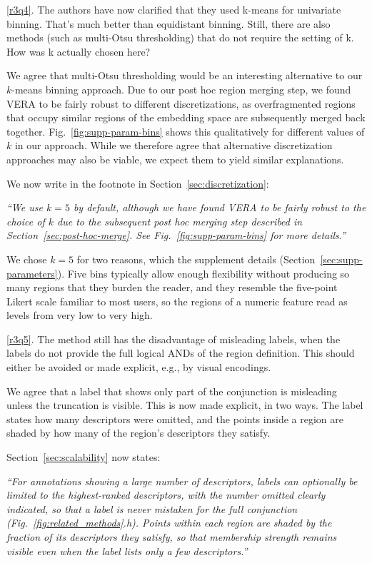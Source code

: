 \documentclass[11pt]{article}
\newcounter{rtaskno}
\newcommand{\rtask}[1]{\refstepcounter{rtaskno}\label{#1}}
\newcommand{\reviewc}[2]{\begin{leftbar}\noindent\rtask{#1}\ref{#1}. #2\end{leftbar}\vspace*{-4mm}}
\newcommand{\answer}[1]{\noindent #1\par\vspace{2mm}}
\newcommand{\copyquote}[1]{\vspace{1mm} {\itshape ``#1''}\vspace{1mm}}
\newlength{\leftbarwidth}
\newlength{\leftbarsep}
\renewenvironment{leftbar}{%
    \def\FrameCommand{{\color{black}{\vrule width \leftbarwidth\relax\hspace {\leftbarsep}}}}%
    \MakeFramed {\advance \hsize -\width \FrameRestore }%
}{\endMakeFramed}
\begin{document}
\reviewc{r3q4}{The authors have now clarified that they used k-means for univariate binning. That's much better than equidistant binning. Still, there are also methods (such as multi-Otsu thresholding) that do not require the setting of k. How was k actually chosen here?}

\answer{%
We agree that multi-Otsu thresholding would be an interesting alternative to our $k$-means binning approach. Due to our post hoc region merging step, we found VERA to be fairly robust to different discretizations, as overfragmented regions that occupy similar regions of the embedding space are subsequently merged back together. Fig.~\ref{fig:supp-param-bins} shows this qualitatively for different values of $k$ in our approach. While we therefore agree that alternative discretization approaches may also be viable, we expect them to yield similar explanations.

We now write in the footnote in Section~\ref{sec:discretization}:

\copyquote{We use $k=5$ by default, although we have found VERA to be fairly robust to the choice of $k$ due to the subsequent post hoc merging step described in Section~\ref{sec:post-hoc-merge}. See Fig.~\ref{fig:supp-param-bins} for more details.}

We chose $k=5$ for two reasons, which the supplement details (Section~\ref{sec:supp-parameters}). Five bins typically allow enough flexibility without producing so many regions that they burden the reader, and they resemble the five-point Likert scale familiar to most users, so the regions of a numeric feature read as levels from very low to very high.
}

\reviewc{r3q5}{The method still has the disadvantage of misleading labels, when the labels do not provide the full logical ANDs of the region definition. This should either be avoided or made explicit, e.g., by visual encodings.}

\answer{%
We agree that a label that shows only part of the conjunction is misleading unless the truncation is visible. This is now made explicit, in two ways. The label states how many descriptors were omitted, and the points inside a region are shaded by how many of the region's descriptors they satisfy.

Section~\ref{sec:scalability} now states:

\copyquote{For annotations showing a large number of descriptors, labels can optionally be limited to the highest-ranked descriptors, with the number omitted clearly indicated, so that a label is never mistaken for the full conjunction (Fig.~\ref{fig:related_methods}.h). Points within each region are shaded by the fraction of its descriptors they satisfy, so that membership strength remains visible even when the label lists only a few descriptors.}
}
\end{document}
